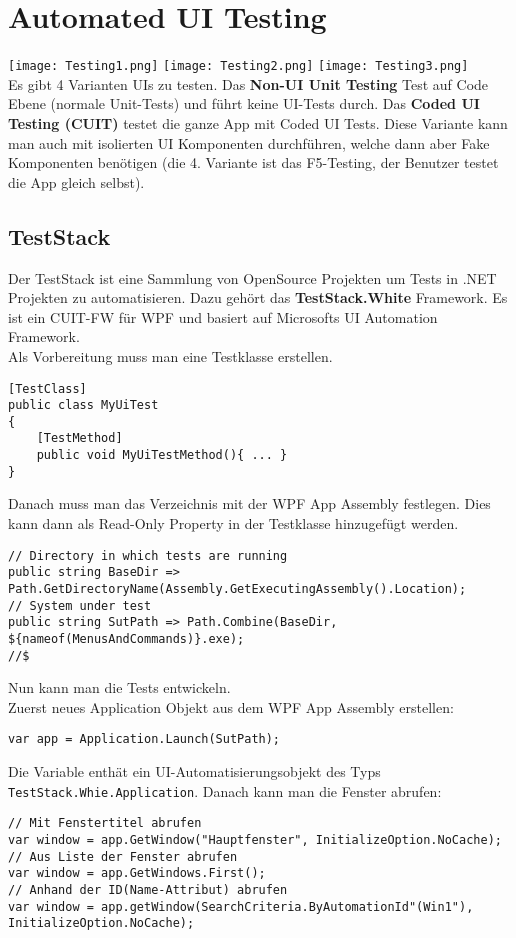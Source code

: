 \section{Automated UI Testing}
\texttt{[image: Testing1.png]}
\texttt{[image: Testing2.png]}
\texttt{[image: Testing3.png]} \\
Es gibt 4 Varianten UIs zu testen. Das \textbf{Non-UI Unit Testing} Test auf Code Ebene (normale Unit-Tests) und führt keine UI-Tests durch. Das \textbf{Coded UI Testing (CUIT)} testet die ganze App mit Coded UI Tests. Diese Variante kann man auch mit isolierten UI Komponenten durchführen, welche dann aber Fake Komponenten benötigen (die 4. Variante ist das F5-Testing, der Benutzer testet die App gleich selbst).
\subsection{TestStack}
Der TestStack ist eine Sammlung von OpenSource Projekten um Tests in .NET Projekten zu automatisieren. Dazu gehört das \textbf{TestStack.White} Framework. Es ist ein CUIT-FW für WPF und basiert auf Microsofts UI Automation Framework. \\
Als Vorbereitung muss man eine Testklasse erstellen.
\begin{lstlisting}
[TestClass]
public class MyUiTest
{
    [TestMethod]
    public void MyUiTestMethod(){ ... }
}
\end{lstlisting}
Danach muss man das Verzeichnis mit der WPF App Assembly festlegen. Dies kann dann als Read-Only Property in der Testklasse hinzugefügt werden.
\begin{lstlisting}
// Directory in which tests are running
public string BaseDir => Path.GetDirectoryName(Assembly.GetExecutingAssembly().Location);
// System under test
public string SutPath => Path.Combine(BaseDir, ${nameof(MenusAndCommands)}.exe);
//$
\end{lstlisting}
Nun kann man die Tests entwickeln. \\
Zuerst neues Application Objekt aus dem WPF App Assembly erstellen:
\begin{lstlisting}[caption="Neues Application Objekt aus dem WPF App Assembly erstellen"]
var app = Application.Launch(SutPath);
\end{lstlisting}
Die Variable enthät ein UI-Automatisierungsobjekt des Typs \verb+TestStack.Whie.Application+.
Danach kann man die Fenster abrufen:
\begin{lstlisting}
// Mit Fenstertitel abrufen
var window = app.GetWindow("Hauptfenster", InitializeOption.NoCache);
// Aus Liste der Fenster abrufen
var window = app.GetWindows.First();
// Anhand der ID(Name-Attribut) abrufen
var window = app.getWindow(SearchCriteria.ByAutomationId"(Win1"), InitializeOption.NoCache);
\end{lstlisting}
